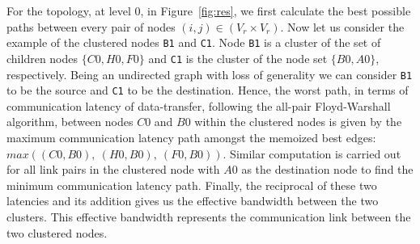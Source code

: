 \begin{itemize}
  For the topology, at level 0, in Figure~\ref{fig:res}, we first
  calculate the best possible paths between every pair of nodes
  \mbox{$(i,j) \in (V_r \times V_r)$}. Now let us consider the example
  of the clustered nodes \texttt{B1} and \texttt{C1}. Node \texttt{B1}
  is a cluster of the set of children nodes $\{C0, H0, F0\}$ and
  \texttt{C1} is the cluster of the node set $\{B0, A0\}$,
  respectively. Being an undirected graph with loss of generality we can
  consider \texttt{B1} to be the source and \texttt{C1} to be the
  destination. Hence, the worst path, in terms of communication latency of
  data-transfer, following the all-pair Floyd-Warshall algorithm,
  between nodes $C0$ and $B0$ within the clustered nodes is given by the
  maximum communication latency path amongst the memoized best edges:
  $max((C0,B0),\
  (H0,B0),\ (F0,B0))$. Similar computation is carried out for all link
  pairs in the clustered node with $A0$ as the destination node to find
  the minimum communication latency path. Finally, the reciprocal of these two
  latencies and its addition gives us the effective bandwidth between
  the two clusters. This effective bandwidth represents the
  communication link between the two clustered nodes.




\end{itemize}


